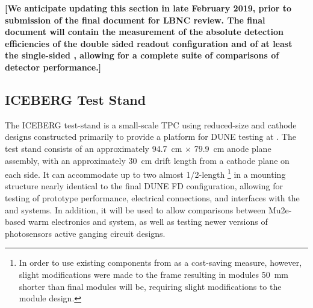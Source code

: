 

{\bf [We anticipate updating this section in late February 2019, prior to submission of the final document for LBNC review.  The final document will contain the measurement of the  absolute detection efficiencies of the double sided readout  configuration and of at least the single-sided , allowing for a complete suite of comparisons of detector performance.]}



% 

\subsection{ICEBERG Test Stand}
\label{sec:iceberg-teststand}

The ICEBERG test-stand is a small-scale TPC using reduced-size   and cathode designs constructed primarily to provide a platform for DUNE  testing at . 
The test stand consists of an approximately \SI{94.7}{cm} $\times$ \SI{79.9}{cm} anode plane assembly, with an approximately \SI{30}{cm} drift length from a cathode plane on each side.  
It can accommodate up to two almost 1/2-length \footnote{In order to use existing  components from  as a cost-saving measure, however, slight modifications were made to the  frame resulting in  modules \SI{50}{mm} shorter than final modules will be, requiring slight modifications to the  module design.} in a mounting structure nearly identical to the final DUNE FD configuration, allowing for testing of  prototype performance, electrical connections, and interfaces with the  and  systems. 
In addition, it will be used to allow comparisons between Mu2e-based warm electronics and   system, as well as testing newer versions of photosensors active ganging circuit designs.

